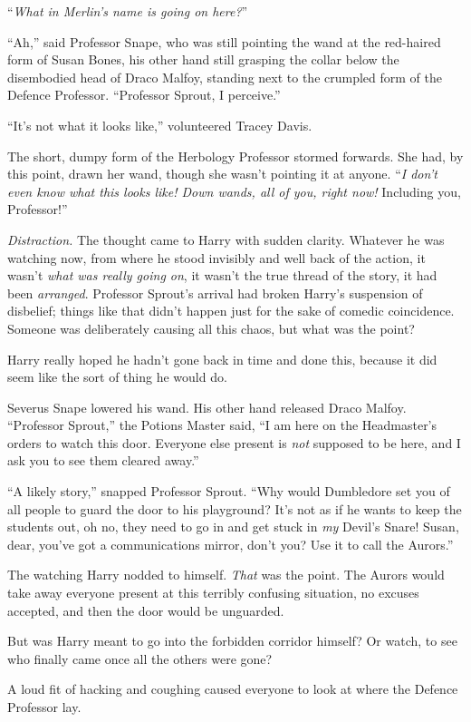 “\emph{What in Merlin’s name is going on here?}”

“Ah,” said Professor Snape, who was still pointing the wand at the red-haired form of Susan Bones, his other hand still grasping the collar below the disembodied head of Draco Malfoy, standing next to the crumpled form of the Defence Professor.
“Professor Sprout, I perceive.”

“It’s not what it looks like,” volunteered Tracey Davis.

The short, dumpy form of the Herbology Professor stormed forwards. She had, by this point, drawn her wand, though she wasn’t pointing it at anyone. “\emph{I don’t even know what this looks like! \emph{Down wands, all of you,} right now!} Including you, Professor!”

\emph{Distraction.} The thought came to Harry with sudden clarity. Whatever he was watching now, from where he stood invisibly and well back of the action, it wasn’t \emph{what was really going on}, it wasn’t the true thread of the story, it had been \emph{arranged}. Professor Sprout’s arrival had broken Harry’s suspension of disbelief; things like that didn’t happen just for the sake of comedic coincidence. Someone was deliberately causing all this chaos, but what was the point?

Harry really hoped he hadn’t gone back in time and done this, because it did seem like the sort of thing he would do.

Severus Snape lowered his wand. His other hand released Draco Malfoy.
“Professor Sprout,” the Potions Master said,
“I am here on the Headmaster’s orders to watch this door. Everyone else present is \emph{not} supposed to be here, and I ask you to see them cleared away.”

“A likely story,” snapped Professor Sprout.
“Why would Dumbledore set you of all people to guard the door to his playground? It’s not as if he wants to keep the students out, oh no, they need to go in and get stuck in \emph{my} Devil’s Snare! Susan, dear, you’ve got a communications mirror, don’t you? Use it to call the Aurors.”

The watching Harry nodded to himself. \emph{That} was the point. The Aurors would take away everyone present at this terribly confusing situation, no excuses accepted, and then the door would be unguarded.

But was Harry meant to go into the forbidden corridor himself? Or watch, to see who finally came once all the others were gone?

A loud fit of hacking and coughing caused everyone to look at where the Defence Professor lay.

